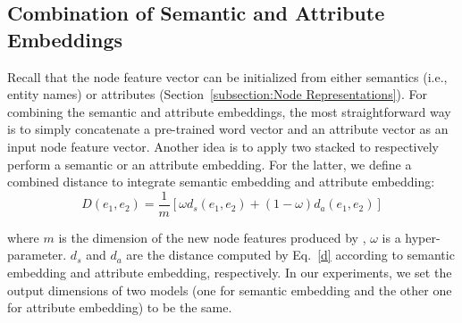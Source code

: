 
	
	\subsection{Combination of Semantic and Attribute Embeddings}
    Recall that the node feature vector can be initialized from either semantics (i.e., entity names) or attributes (Section~\ref{subsection:Node
    Representations}). For combining the semantic and attribute embeddings, the most straightforward way is to simply concatenate a pre-trained word vector and an attribute vector as an input node feature vector. Another idea is to apply two stacked \HRGCNs to respectively perform a semantic or an attribute embedding.
%
	For the latter, we define a combined distance to integrate semantic embedding and attribute embedding:
	\begin{equation}
		D(e_1,e_2)=\frac{1}{m}[\omega d_s(e_1,e_2)+(1-\omega)d_a(e_1,e_2)]
	\end{equation}

	where $m$ is the dimension of the new node features produced by \HRGCNs, $\omega$ is a hyper-parameter. $d_s$ and $d_a$ are the distance computed by Eq.~\ref{d} according to semantic embedding and attribute embedding, respectively.
	In our experiments, we set the output dimensions of two models (one for semantic embedding and the other one for attribute embedding) to be the same.
	
	
